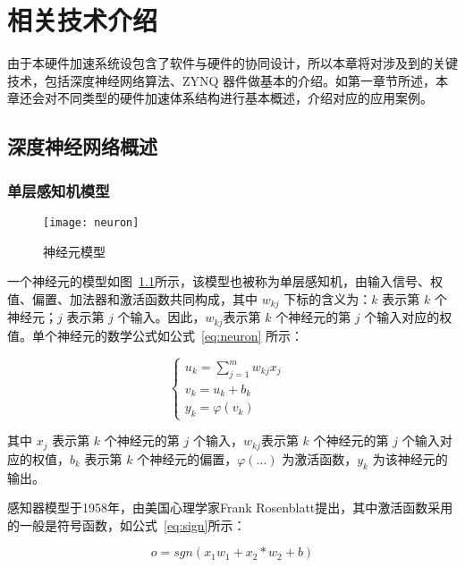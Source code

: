 \chapter{相关技术介绍}\label{chap:introduction}

由于本硬件加速系统设包含了软件与硬件的协同设计，所以本章将对涉及到的关键技术，包括深度神经网络算法、ZYNQ 器件做基本的介绍。如第一章节所述，本章还会对不同类型的硬件加速体系结构进行基本概述，介绍对应的应用案例。


\section{深度神经网络概述}

\subsection{单层感知机模型}

\begin{figure}[!htbp]
    \centering
    \texttt{[image: neuron]}
    \caption{神经元模型}
    \label{fig:neuron}
\end{figure}

一个神经元的模型如图~\ref{fig:neuron}所示，该模型也被称为单层感知机，由输入信号、权值、偏置、加法器和激活函数共同构成，其中 $w_{kj}$ 下标的含义为：$k$ 表示第 $k$ 个神经元；$j$ 表示第 $j$ 个输入。因此，$w_{kj}$表示第 $k$ 个神经元的第 $j$ 个输入对应的权值。单个神经元的数学公式如公式~\eqref{eq:neuron} 所示：

\begin{equation} \label{eq:neuron}
\begin{cases}
u_k = \sum_{j=1}^{m} w_{kj}x_j & \\
v_k = u_k + b_k & \\
y_k = \varphi(v_k) &
\end{cases}
\end{equation}

其中 $x_j$ 表示第 $k$ 个神经元的第 $j$ 个输入，$w_{kj}$表示第 $k$ 个神经元的第 $j$ 个输入对应的权值，$b_k$ 表示第 $k$ 个神经元的偏置，$\varphi(\dots)$ 为激活函数，$y_k$ 为该神经元的输出。

感知器模型于1958年，由美国心理学家Frank Rosenblatt提出\cite{10.5555/1074100.1074686}，其中激活函数采用的一般是符号函数，如公式~\eqref{eq:sign}所示：

\begin{equation} \label{eq:sign}
    o = sgn(x_1w_1+x_2*w_2+b)
\end{equation}

